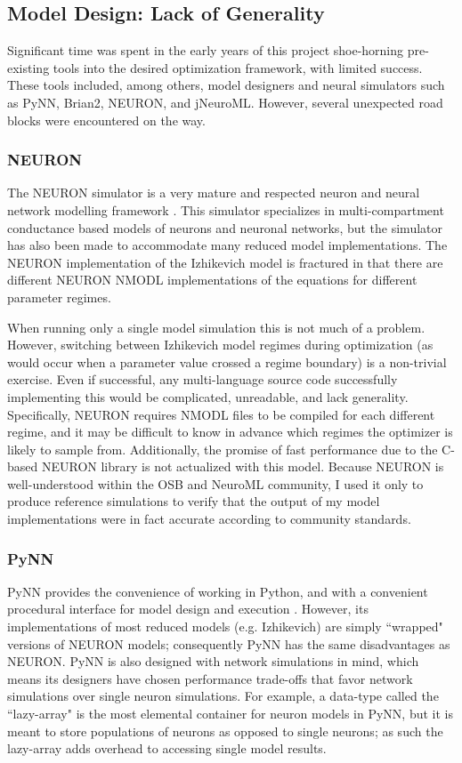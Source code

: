 \subsection{Model Design: Lack of Generality}
Significant time was spent in the early years of this project shoe-horning pre-existing tools into the desired optimization framework, with limited success.
These tools included, among others, model designers and neural simulators such as PyNN, Brian2, NEURON, and jNeuroML.
However, several unexpected road blocks were encountered on the way.

\subsubsection{NEURON}
The NEURON simulator is a very mature and respected neuron and neural network modelling framework \citep{carnevale2006neuron}. This simulator specializes in multi-compartment conductance based models of neurons and neuronal networks, but the simulator has also been made to accommodate many reduced model implementations. The NEURON implementation of the Izhikevich model is fractured in that there are different NEURON NMODL implementations of the equations for different parameter regimes.

When running only a single model simulation this is not much of a problem. However, switching between Izhikevich model regimes during optimization (as would occur when a parameter value crossed a regime boundary) is a non-trivial exercise.
Even if successful, any multi-language source code successfully implementing this would be complicated, unreadable, and lack generality.
Specifically, NEURON requires NMODL files to be compiled for each different regime, and it may be difficult to know in advance which regimes the optimizer is likely to sample from.
Additionally, the promise of fast performance due to the C-based NEURON library is not actualized with this model.
Because NEURON is well-understood within the OSB and NeuroML community, I used it only to produce reference simulations to verify that the output of my model implementations were in fact accurate according to community standards.

\subsubsection{PyNN}
PyNN provides the convenience of working in Python, and with a convenient procedural interface for model design and execution \citep{davison2009pynn}.
However, its implementations of most reduced models (e.g. Izhikevich) are simply ``wrapped" versions of NEURON models; consequently PyNN has the same disadvantages as NEURON.
PyNN is also designed with network simulations in mind, which means its designers have chosen performance trade-offs that favor network simulations over single neuron simulations.
For example, a data-type called the ``lazy-array" is the most elemental container for neuron models in PyNN, but it is meant to store populations of neurons as opposed to single neurons;
as such the lazy-array adds overhead to accessing single model results.

